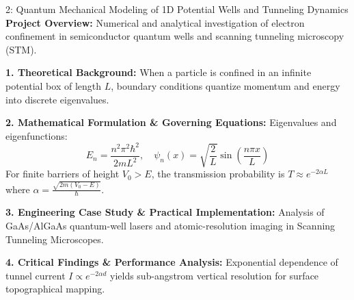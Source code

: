 \vspace{4mm}

\begin{projectbox}{2: Quantum Mechanical Modeling of 1D Potential Wells and Tunneling Dynamics}
\textbf{Project Overview:} Numerical and analytical investigation of electron confinement in semiconductor quantum wells and scanning tunneling microscopy (STM).

\textbf{1. Theoretical Background:}
When a particle is confined in an infinite potential box of length $L$, boundary conditions quantize momentum and energy into discrete eigenvalues.

\textbf{2. Mathematical Formulation \& Governing Equations:}
Eigenvalues and eigenfunctions:
\begin{equation}
E_n = \frac{n^2 \pi^2 \hbar^2}{2m L^2}, \quad \psi_n(x) = \sqrt{\frac{2}{L}}\sin\left(\frac{n\pi x}{L}\right)
\end{equation}
For finite barriers of height $V_0 > E$, the transmission probability is $T \approx e^{-2\alpha L}$ where $\alpha = \frac{\sqrt{2m(V_0 - E)}}{\hbar}$.

\textbf{3. Engineering Case Study \& Practical Implementation:}
Analysis of GaAs/AlGaAs quantum-well lasers and atomic-resolution imaging in Scanning Tunneling Microscopes.

\textbf{4. Critical Findings \& Performance Analysis:}
Exponential dependence of tunnel current $I \propto e^{-2\alpha d}$ yields sub-angstrom vertical resolution for surface topographical mapping.
\end{projectbox}

\vspace{4mm}

